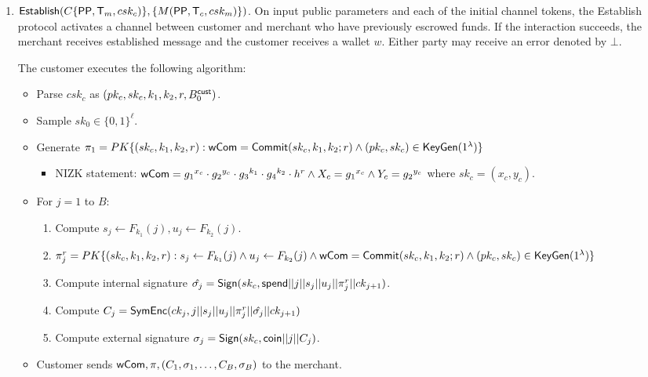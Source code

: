 \documentclass[11pt]{report}
\newcommand{\BC}{B^{\text{\sf cust}}_{\text{0}}}
\begin{document}
\begin{enumerate}
\item ${\sf Establish}( C\{{\sf PP}, {\sf T}_m, csk_c)\}, \{M({\sf PP}, {\sf T}_c, csk_{m})\})$. On input public parameters and each of the initial
channel tokens, the {\sf Establish} protocol activates a channel between customer and merchant who have previously
escrowed funds. If the interaction succeeds, the merchant receives {\sf established} message and the customer
receives a wallet $w$. Either party may receive an error denoted by $\bot$.

\medskip \noindent
The customer executes the following algorithm:
\begin{itemize}
\item Parse $csk_c$ as $(pk_c, sk_c, k_1, k_2, r, \BC)$.
\item Sample $sk_0 \in \{0,1\}^\ell$.
\item Generate $\pi_1 = PK\{ (sk_c, k_1, k_2, r) : {\sf wCom} = {\sf Commit}(sk_c, k_1, k_2; r) \wedge (pk_c, sk_c) \in {\sf KeyGen}(1^\lambda)\}$
\begin{itemize}
\item {\sf NIZK} statement: ${\sf wCom} = {g_1}^{x_c} \cdot {g_2}^{y_c} \cdot {g_3}^{k_1} \cdot {g_4}^{k_2} \cdot h^r \wedge X_c = {g_1}^{x_c} \wedge Y_c = {g_2}^{y_c}$  where $sk_c = (x_c, y_c)$.
\end{itemize}
\item For $j  = 1$ to $B$:
\begin{enumerate}
\item Compute $s_j  \leftarrow F_{k_1}(j), u_j \leftarrow F_{k_2}(j)$.
\item $\pi_{j}^r = PK\{ (sk_c, k_1, k_2, r) : s_j  \leftarrow F_{k_1}(j) \wedge u_j \leftarrow F_{k_2}(j) \\ \wedge {\sf wCom} = {\sf Commit}(sk_c, k_1, k_2; r)  \\ \wedge (pk_c, sk_c) \in {\sf KeyGen}(1^\lambda)\}$
\item Compute internal signature $\hat{\sigma_j} = {\sf Sign}(sk_c, {\sf spend}||j||s_j||u_j||\pi_{j}^r||ck_{j+1})$.
\item Compute $C_j = {\sf SymEnc}(ck_j, j||s_j||u_j||\pi_{j}^r||\hat{\sigma_j}||ck_{j+1})$
\item Compute external signature $\sigma_j = {\sf Sign}(sk_c, {\sf coin}||j||C_j)$.
\end{enumerate}
\item Customer sends ${\sf wCom}, \pi, (C_1, \sigma_1,\dots,C_B,\sigma_B)$ to the merchant.
\end{itemize}


\end{enumerate}
\end{document}
